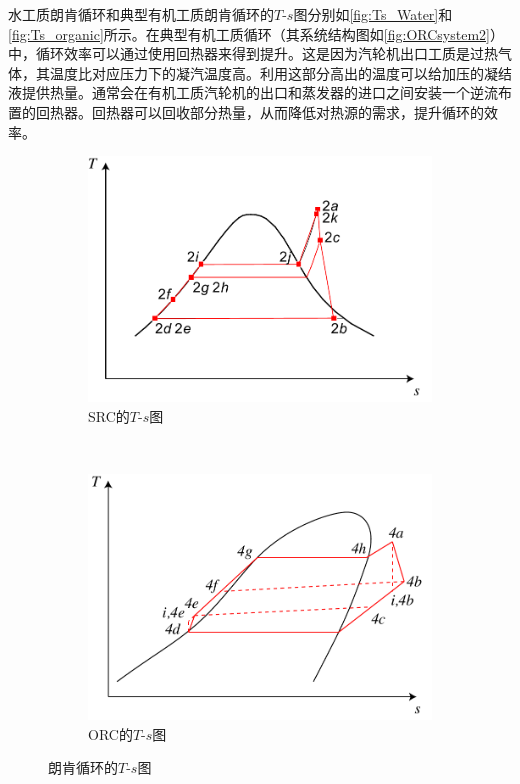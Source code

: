 水工质朗肯循环和典型有机工质朗肯循环的$T$-$s$图分别如\autoref{fig:Ts_Water}和\autoref{fig:Ts_organic}所示。在典型有机工质循环（其系统结构图如\autoref{fig:ORCsystem2}）中，循环效率可以通过使用回热器来得到提升。这是因为汽轮机出口工质是过热气体，其温度比对应压力下的凝汽温度高。利用这部分高出的温度可以给加压的凝结液提供热量。通常会在有机工质汽轮机的出口和蒸发器的进口之间安装一个逆流布置的回热器。回热器可以回收部分热量，从而降低对热源的需求，提升循环的效率。

\begin{figure}[htbp]
\centering
	\begin{subfigure}[b]{0.4\columnwidth}
	\includegraphics[width = \columnwidth]{fig/Ts_a.pdf}
	\caption{SRC的$T$-$s$图}\label{fig:Ts_Water}
	\end{subfigure}
	~
\begin{subfigure}[b]{0.4\columnwidth}
	\includegraphics[width = \columnwidth]{fig/Ts_b.pdf}
	\caption{ORC的$T$-$s$图}\label{fig:Ts_organic}
	\end{subfigure}
	\caption{朗肯循环的$T$-$s$图}
	\label{fig:Ts}
\end{figure}

